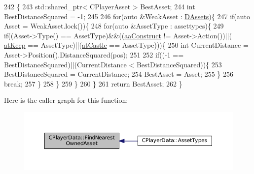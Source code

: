 \begin{DoxyCode}
242                                                                                                            
                       \{
243     std::shared\_ptr< CPlayerAsset > BestAsset;
244     \textcolor{keywordtype}{int} BestDistanceSquared = -1;
245 
246     \textcolor{keywordflow}{for}(\textcolor{keyword}{auto} &WeakAsset : \hyperlink{classCPlayerData_a1d7dd355facf52db6242e3554373906c}{DAssets})\{
247         \textcolor{keywordflow}{if}(\textcolor{keyword}{auto} Asset = WeakAsset.lock())\{
248             \textcolor{keywordflow}{for}(\textcolor{keyword}{auto} &AssetType : assettypes)\{
249                 \textcolor{keywordflow}{if}((Asset->Type() == AssetType)&&((\hyperlink{GameDataTypes_8h_ab47668e651a3032cfb9c40ea2d60d670a7ef6b863f66dd7dcc95a199cd758ae1d}{aaConstruct} != Asset->Action())||(
      \hyperlink{GameDataTypes_8h_a5600d4fc433b83300308921974477fecaaed39451bedb0392ad95fbc9c95bef31}{atKeep} == AssetType)||(\hyperlink{GameDataTypes_8h_a5600d4fc433b83300308921974477feca6727b47855e74f3f7b6e4a96d0c2a42a}{atCastle} == AssetType)))\{
250                     \textcolor{keywordtype}{int} CurrentDistance = Asset->Position().DistanceSquared(pos);
251                     
252                     \textcolor{keywordflow}{if}((-1 == BestDistanceSquared)||(CurrentDistance < BestDistanceSquared))\{
253                         BestDistanceSquared = CurrentDistance;
254                         BestAsset = Asset;
255                     \}
256                     \textcolor{keywordflow}{break};
257                 \}
258             \}
259         \}
260     \}
261     \textcolor{keywordflow}{return} BestAsset;
262 \}
\end{DoxyCode}
Here is the caller graph for this function\+:\nopagebreak
\begin{figure}[H]
\begin{center}
\leavevmode
\includegraphics[width=350pt]{classCPlayerData_a53c9e046c6f43fd83a0feb32b4fe999d_icgraph}
\end{center}
\end{figure}
\hypertarget{classCPlayerData_a45b5ba15a17796acdbaca7eacc7532d0}{}\label{classCPlayerData_a45b5ba15a17796acdbaca7eacc7532d0} 
